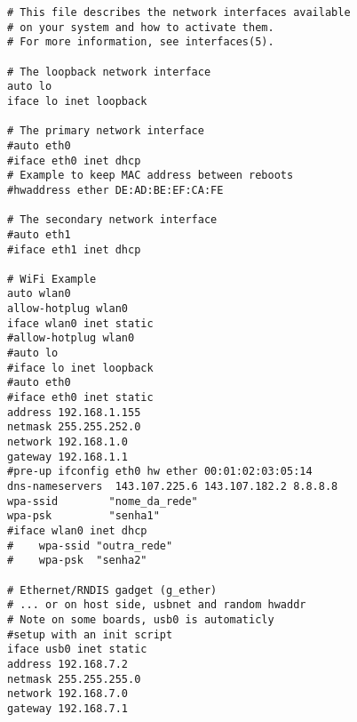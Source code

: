 \lstset{language=bash}
\begin{lstlisting}[frame=single, basicstyle=\linespread{0.85}\ttfamily\tiny, caption=/etc/network/interfaces, label=etc_net]
# This file describes the network interfaces available
# on your system and how to activate them.
# For more information, see interfaces(5).

# The loopback network interface
auto lo
iface lo inet loopback

# The primary network interface
#auto eth0
#iface eth0 inet dhcp
# Example to keep MAC address between reboots
#hwaddress ether DE:AD:BE:EF:CA:FE

# The secondary network interface
#auto eth1
#iface eth1 inet dhcp

# WiFi Example
auto wlan0
allow-hotplug wlan0
iface wlan0 inet static
#allow-hotplug wlan0
#auto lo
#iface lo inet loopback
#auto eth0
#iface eth0 inet static
address 192.168.1.155
netmask 255.255.252.0
network 192.168.1.0
gateway 192.168.1.1
#pre-up ifconfig eth0 hw ether 00:01:02:03:05:14
dns-nameservers  143.107.225.6 143.107.182.2 8.8.8.8
wpa-ssid        "nome_da_rede"
wpa-psk         "senha1"
#iface wlan0 inet dhcp
#    wpa-ssid "outra_rede"
#    wpa-psk  "senha2"

# Ethernet/RNDIS gadget (g_ether)
# ... or on host side, usbnet and random hwaddr
# Note on some boards, usb0 is automaticly 
#setup with an init script
iface usb0 inet static
address 192.168.7.2
netmask 255.255.255.0
network 192.168.7.0
gateway 192.168.7.1
\end{lstlisting}

